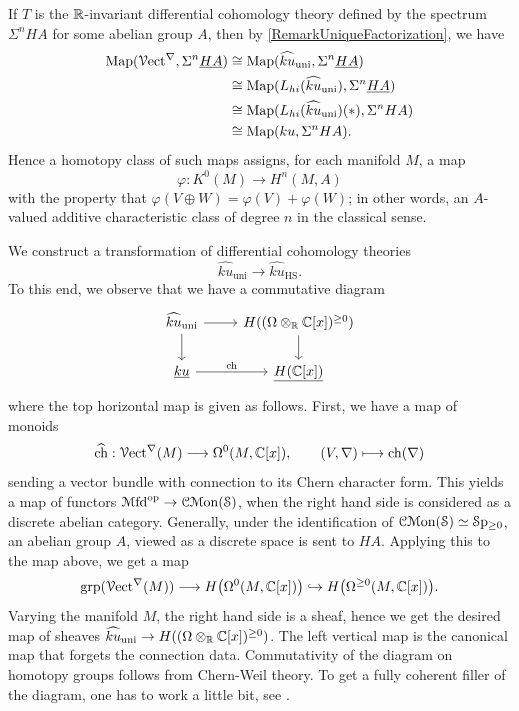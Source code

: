 \documentclass[10pt]{amsart}
\begin{document}
\begin{example}
If $T$ is the $\mathbb{R}$-invariant differential cohomology theory defined by the spectrum $\Sigma^n HA$ for some abelian group $A$, then by \cref{RemarkUniqueFactorization}, we have
\begin{align*}
\mathrm{Map}(\mathcal{V}\mathrm{ect}^\nabla,  \Sigma^n \underline{HA})
&\cong 
\mathrm{Map}(\widehat{ku}{}_{\mathrm{uni}},  \Sigma^n \underline{HA})
\\
&\cong 
\mathrm{Map}(L_{hi}(\widehat{ku}{}_{\mathrm{uni}}),  \Sigma^n \underline{HA})
\\
&\cong 
\mathrm{Map}(L_{hi}(\widehat{ku}{}_{\mathrm{uni}})(*),  \Sigma^n HA)
\\
&\cong 
\mathrm{Map}(ku,  \Sigma^n HA).
\end{align*}
Hence a homotopy class of such maps assigns, for each manifold $M$, a map
\[
\varphi : K^0(M) \longrightarrow H^n(M, A)
\]
with the property that $\varphi(V \oplus W) = \varphi(V) + \varphi(W)$; in other words, an $A$-valued additive characteristic class of degree $n$ in the classical sense.
\end{example}





We construct a transformation of differential cohomology theories
\[
\widehat{ku}{}_{\mathrm{uni}} \longrightarrow \widehat{ku}_{\mathrm{HS}}.
\]
To this end, we observe that we have a commutative diagram
\[
\begin{tikzcd}
	\widehat{ku}_{\mathrm{uni}} \ar[r] \ar[d] & H((\Omega \otimes_\bR \bC[x])^{\geq 0})
	\ar[d]
	\\
	\underline{ku} \ar[r, "\ch"] 
	& \underline{H(\bC[x])}
\end{tikzcd}
\]
where the top horizontal map is given as follows. First, we have a map of monoids
\[
\widehat{\mathrm{ch}} : \mathcal{V}\mathrm{ect}^\nabla(M) \longrightarrow \Omega^0(M, \mathbb{C}[x]), \qquad (V, \nabla) \longmapsto \mathrm{ch}(\nabla)
\]
sending a vector bundle with connection to its Chern character form. This yields a map of functors $\mathcal{M}\mathrm{fd}^{\mathrm{op}} \to \mathcal{C}\mathcal{M}\mathrm{on}(\mathcal{S})$, when the right hand side is considered as a discrete abelian category. Generally, under the identification of $\mathcal{C}\mathcal{M}\mathrm{on}(\mathcal{S}) \simeq \mathcal{S}\mathrm{p}_{\geq 0}$, an abelian group $A$, viewed as a discrete space is sent to $HA$. Applying this to the map above, we get a map
\[
\mathrm{grp}(\mathcal{V}\mathrm{ect}^\nabla(M)) \longrightarrow H\bigl(\Omega^{0}(M, \mathbb{C}[x])\bigr) \hookrightarrow H\bigl(\Omega^{\geq 0}(M, \mathbb{C}[x])\bigr).
\]
Varying the manifold $M$, the right hand side is a sheaf, hence we get the desired map of sheaves $\widehat{ku}_{\mathrm{uni}} \to H((\Omega \otimes_{\mathbb{R}} \mathbb{C}[x])^{\geq 0})$. The left vertical map is the canonical map that forgets the connection data. Commutativity of the diagram on homotopy groups follows from Chern-Weil theory. To get a fully coherent filler of the diagram, one has to work a little bit, see \cite[\S6.1]{bunkenikolausvoelkl2016diffcoh}.
\end{document}
